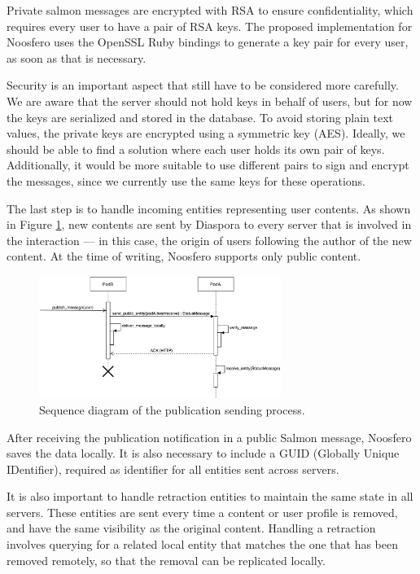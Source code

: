 Private salmon messages are encrypted with RSA to ensure
confidentiality, which requires every user to have a pair of RSA keys.
The proposed implementation for Noosfero uses the OpenSSL Ruby bindings
to generate a key pair for every user, as soon as that is necessary.

Security is an important aspect that still have to be considered more
carefully. We are aware that the server should not hold keys in behalf of
users, but for now the keys are serialized and stored in the database. To avoid
storing plain text values, the private keys are encrypted using a symmetric key
(AES). Ideally, we should be able to find a solution where each user holds its
own pair of keys. Additionally, it would be more suitable to use different
pairs to sign and encrypt the messages, since we currently use the same
keys for these operations.

The last step is to handle incoming entities representing user contents.
As shown in Figure \ref{fig:seq_publication}, new contents are sent by
Diaspora to every server that is involved in the interaction --- in this
case, the origin of users following the author of the new content. At
the time of writing, Noosfero supports only public content.

\begin{figure}[h]
	\centering
		\includegraphics[width=0.7\textwidth]{figures/seq_publicacao.eps}
	\caption{Sequence diagram of the publication sending process.}
	\label{fig:seq_publication}
\end{figure}

After receiving the publication notification in a public Salmon message,
Noosfero  saves the data locally. It is also necessary to include a GUID
(Globally Unique IDentifier), required as identifier for all entities sent
across servers.

It is also important to handle retraction entities to maintain the same state
in all servers. These entities are sent every time a content or user profile is
removed, and have the same visibility as the original content.  Handling a
retraction involves querying for a related local entity that matches the one
that has been removed remotely, so that the removal can be replicated locally.
